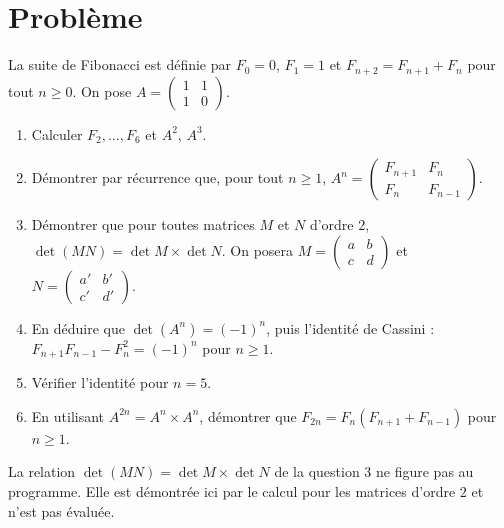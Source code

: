 \section{Problème}
\begin{problem}
La suite de Fibonacci est définie par $F_0=0$, $F_1=1$ et $F_{n+2}=F_{n+1}+F_n$ pour tout $n\ge0$. On pose $A=\begin{pmatrix}1&1\\1&0\end{pmatrix}$.
\begin{enumerate}
\item Calculer $F_2,\dots,F_6$ et $A^2$, $A^3$.
\item Démontrer par récurrence que, pour tout $n\ge1$, $A^n=\begin{pmatrix}F_{n+1}&F_n\\F_n&F_{n-1}\end{pmatrix}$.
\item Démontrer que pour toutes matrices $M$ et $N$ d'ordre $2$, $\det(MN)=\det M\times\det N$. On posera $M=\begin{pmatrix}a&b\\c&d\end{pmatrix}$ et $N=\begin{pmatrix}a'&b'\\c'&d'\end{pmatrix}$.
\item En déduire que $\det\left(A^n\right)=(-1)^n$, puis l'identité de Cassini : $F_{n+1}F_{n-1}-F_n^2=(-1)^n$ pour $n\ge1$.
\item Vérifier l'identité pour $n=5$.
\item En utilisant $A^{2n}=A^n\times A^n$, démontrer que $F_{2n}=F_n\left(F_{n+1}+F_{n-1}\right)$ pour $n\ge1$.
\end{enumerate}
\end{problem}
\begin{beyond}La relation $\det(MN)=\det M\times\det N$ de la question 3 ne figure pas au programme. Elle est démontrée ici par le calcul pour les matrices d'ordre $2$ et n'est pas évaluée.\end{beyond}
